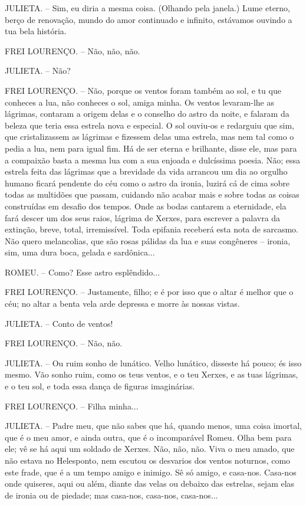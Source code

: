 JULIETA. -- Sim, eu diria a mesma coisa. (Olhando pela janela.) Lume
eterno, berço de renovação, mundo do amor continuado e infinito,
estávamos ouvindo a tua bela história.

FREI LOURENÇO. -- Não, não, não.

JULIETA. -- Não?

FREI LOURENÇO. -- Não, porque os ventos foram também ao sol, e tu que
conheces a lua, não conheces o sol, amiga minha. Os ventos levaram-lhe
as lágrimas, contaram a origem delas e o conselho do astro da noite, e
falaram da beleza que teria essa estrela nova e especial. O sol ouviu-os
e redarguiu que sim, que cristalizassem as lágrimas e fizessem delas uma
estrela, mas nem tal como o pedia a lua, nem para igual fim. Há de ser
eterna e brilhante, disse ele, mas para a compaixão basta a mesma lua
com a sua enjoada e dulcíssima poesia. Não; essa estrela feita das
lágrimas que a brevidade da vida arrancou um dia ao orgulho humano
ficará pendente do céu como o astro da ironia, luzirá cá de cima sobre
todas as multidões que passam, cuidando não acabar mais e sobre todas as
coisas construídas em desafio dos tempos. Onde as bodas cantarem a
eternidade, ela fará descer um dos seus raios, lágrima de Xerxes, para
escrever a palavra da extinção, breve, total, irremissível. Toda
epifania receberá esta nota de sarcasmo. Não quero melancolias, que são
rosas pálidas da lua e suas congêneres -- ironia, sim, uma dura boca,
gelada e sardônica...

ROMEU. -- Como? Esse astro esplêndido...

FREI LOURENÇO. -- Justamente, filho; e é por isso que o altar é melhor
que o céu; no altar a benta vela arde depressa e morre às nossas vistas.

JULIETA. -- Conto de ventos!

FREI LOURENÇO. -- Não, não.

JULIETA. -- Ou ruim sonho de lunático. Velho lunático, disseste há
pouco; és isso mesmo. Vão sonho ruim, como os teus ventos, e o teu
Xerxes, e as tuas lágrimas, e o teu sol, e toda essa dança de figuras
imaginárias.

FREI LOURENÇO. -- Filha minha...

JULIETA. -- Padre meu, que não sabes que há, quando menos, uma coisa
imortal, que é o meu amor, e ainda outra, que é o incomparável Romeu.
Olha bem para ele; vê se há aqui um soldado de Xerxes. Não, não, não.
Viva o meu amado, que não estava no Helesponto, nem escutou os desvarios
dos ventos noturnos, como este frade, que é a um tempo amigo e inimigo.
Sê só amigo, e casa-nos. Casa-nos onde quiseres, aqui ou além, diante
das velas ou debaixo das estrelas, sejam elas de ironia ou de piedade;
mas casa-nos, casa-nos, casa-nos...

